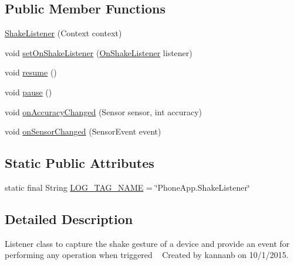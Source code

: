\subsection*{Public Member Functions}
\begin{DoxyCompactItemize}
\item 
\hyperlink{classcourse_1_1examples_1_1phoneapp_1_1_shake_listener_a1ab0dfd3a0312f22d80553fc86517ef4}{Shake\+Listener} (Context context)
\item 
void \hyperlink{classcourse_1_1examples_1_1phoneapp_1_1_shake_listener_a55bc555dadb88dcb1f51b8e5e0c952cc}{set\+On\+Shake\+Listener} (\hyperlink{interfacecourse_1_1examples_1_1phoneapp_1_1_shake_listener_1_1_on_shake_listener}{On\+Shake\+Listener} listener)
\item 
void \hyperlink{classcourse_1_1examples_1_1phoneapp_1_1_shake_listener_a53d8ca8e5fda8c6b6e6fe9659d5badc9}{resume} ()
\item 
void \hyperlink{classcourse_1_1examples_1_1phoneapp_1_1_shake_listener_a5214588f55677bad1967cde68353b7ef}{pause} ()
\item 
void \hyperlink{classcourse_1_1examples_1_1phoneapp_1_1_shake_listener_a5adb466838aaee55687d30ec1d032dda}{on\+Accuracy\+Changed} (Sensor sensor, int accuracy)
\item 
void \hyperlink{classcourse_1_1examples_1_1phoneapp_1_1_shake_listener_a5faea5509575f61399e18873b33afbd0}{on\+Sensor\+Changed} (Sensor\+Event event)
\end{DoxyCompactItemize}
\subsection*{Static Public Attributes}
\begin{DoxyCompactItemize}
\item 
static final String \hyperlink{classcourse_1_1examples_1_1phoneapp_1_1_shake_listener_a6ed24cf98223b33bfa637cf67c801914}{L\+O\+G\+\_\+\+T\+A\+G\+\_\+\+N\+A\+M\+E} = \char`\"{}Phone\+App.\+Shake\+Listener\char`\"{}
\end{DoxyCompactItemize}


\subsection{Detailed Description}
Listener class to capture the shake gesture of a device and provide an event for performing any operation when triggered ~\newline
 Created by kannanb on 10/1/2015. 

